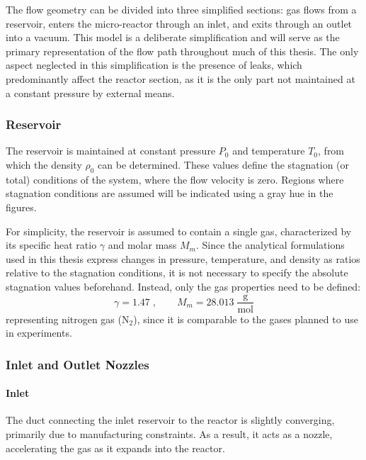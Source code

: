 
The flow geometry can be divided into three simplified sections: gas flows from a reservoir, enters the micro-reactor through an inlet, and exits through an outlet into a vacuum.
This model is a deliberate simplification and will serve as the primary representation of the flow path throughout much of this thesis.
The only aspect neglected in this simplification is the presence of leaks, which predominantly affect the reactor section, as it is the only part not maintained at a constant pressure by external means.

\subsubsection*{Reservoir}
	The reservoir is maintained at constant pressure $P_0$ and temperature $T_0$, from which the density $\rho_0$ can be determined.
	These values define the stagnation (or total) conditions of the system, where the flow velocity is zero.
	Regions where stagnation conditions are assumed will be indicated using a gray hue in the figures.

	For simplicity, the reservoir is assumed to contain a single gas, characterized by its specific heat ratio $\gamma$ and molar mass $M_m$.
	Since the analytical formulations used in this thesis express changes in pressure, temperature, and density as ratios relative to the stagnation conditions, it is not necessary to specify the absolute stagnation values beforehand.
	Instead, only the gas properties need to be defined:
	$$
		\gamma = 1.47\;, \qquad M_m = 28.013\; \frac{\text{g}}{\text{mol}}
	$$
	representing nitrogen gas ($\text{N}_2$), since it is comparable to the gases planned to use in experiments.
	\newpage

\subsubsection*{Inlet and Outlet Nozzles}

	\paragraph{Inlet}
	The duct connecting the inlet reservoir to the reactor is slightly converging, primarily due to manufacturing constraints.
	As a result, it acts as a nozzle, accelerating the gas as it expands into the reactor.

